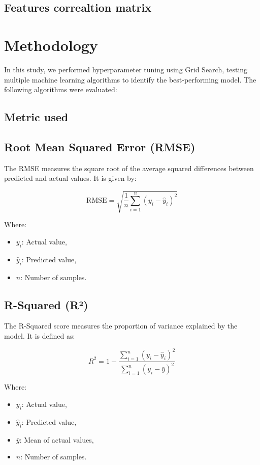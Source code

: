\documentclass{article}
\begin{document}
\subsection{Features correaltion matrix}


\section{Methodology}
In this study, we performed hyperparameter tuning using Grid Search, testing multiple machine learning algorithms to identify the best-performing model. The following algorithms were evaluated:

\subsection{Metric used}

\subsection*{Root Mean Squared Error (RMSE)}

The RMSE measures the square root of the average squared differences between predicted and actual values. It is given by:

\[
\text{RMSE} = \sqrt{\frac{1}{n} \sum_{i=1}^n (y_i - \hat{y}_i)^2}
\]

Where:
\begin{itemize}
    \item \( y_i \): Actual value,
    \item \( \hat{y}_i \): Predicted value,
    \item \( n \): Number of samples.
\end{itemize}

\subsection*{R-Squared (R²)}

The R-Squared score measures the proportion of variance explained by the model. It is defined as:

\[
R^2 = 1 - \frac{\sum_{i=1}^n (y_i - \hat{y}_i)^2}{\sum_{i=1}^n (y_i - \bar{y})^2}
\]

Where:
\begin{itemize}
    \item \( y_i \): Actual value,
    \item \( \hat{y}_i \): Predicted value,
    \item \( \bar{y} \): Mean of actual values,
    \item \( n \): Number of samples.
\end{itemize}
\end{document}
